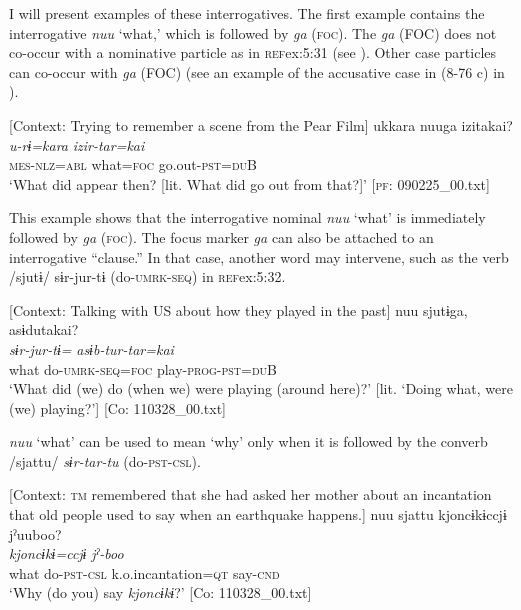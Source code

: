   I will present examples of these interrogatives. The first example contains the interrogative \textit{nuu} ‘what,’ which is followed by \textit{ga} (\textsc{foc}). The \textit{ga} (FOC) does not co-occur with a nominative particle as in \textsc{ref}{ex:5:31} (see ). Other case particles can co-occur with \textit{ga} (FOC) (see an example of the accusative case in (8-76 c) in ).

\ea \label{ex:5:31}   [Context: Trying to remember a scene from the Pear Film]
\glll  ukkara  nuuga  izitakai?\\
\textit{u-rɨ=kara}  \textit{}  \textit{izir-tar=kai}\\
\textsc{mes}-\textsc{nlz}=\textsc{abl}  what=\textsc{foc}  go.out-\textsc{pst}=\textsc{du}B\\
\glt ‘What did appear then? [lit. What did go out from that?]’ [\textsc{pf}: 090225\_00.txt]
\z

This example shows that the interrogative nominal \textit{nuu} ‘what’ is immediately followed by \textit{ga} (\textsc{foc}). The focus marker \textit{ga} can also be attached to an interrogative “clause.” In that case, another word may intervene, such as the verb /sjutɨ/ sɨr-jur-tɨ (do-\textsc{umrk}-\textsc{seq}) in \textsc{ref}{ex:5:32}.

\ea \label{ex:5:32}   [Context: Talking with US about how they played in the past]
\glll  nuu  sjutɨga,  asɨdutakai?\\
\textit{}  \textit{sɨr-jur-tɨ=}  \textit{asɨb-tur-tar=kai}\\
what  do-\textsc{umrk}-\textsc{seq}=\textsc{foc}  play-\textsc{prog}-\textsc{pst}=\textsc{du}B\\
\glt ‘What did (we) do (when we) were playing (around here)?’ [lit. ‘Doing what, were (we) playing?’] [Co: 110328\_00.txt]
\z

\textit{nuu} ‘what’ can be used to mean ‘why’ only when it is followed by the converb /sjattu/ \textit{sɨr-tar-tu} (do-\textsc{pst}-\textsc{csl}).

\ea \label{ex:5:33}   [Context: \textsc{tm} remembered that she had asked her mother about an incantation that old people used to say when an earthquake happens.]
\glll  nuu  sjattu  {\textbar}kjoncɨkɨ{\textbar}ccjɨ  jˀuuboo?\\
\textit{}  \textit{}  \textit{kjoncɨkɨ=ccjɨ}  \textit{jˀ-boo}\\
what  do-\textsc{pst}-\textsc{csl}  k.o.incantation=\textsc{qt}  say-\textsc{cnd}\\
\glt ‘Why (do you) say \textit{kjoncɨkɨ}?’ [Co: 110328\_00.txt]
\z


